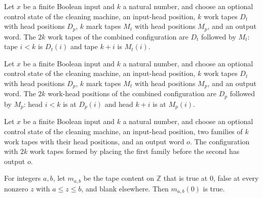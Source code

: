 \begin{lemma}
\label{Complexity.LogProg.ccfg_workTapes}
\leanok
{}
Let $x$ be a finite Boolean input and $k$ a natural number, and choose an optional
control state of the cleaning machine, an input-head position, $k$ work tapes $D_t$
with head positions $D_p$, $k$ mark tapes $M_t$ with head positions $M_p$, and an output
word. The $2k$ work tapes of the combined configuration are $D_t$ followed by $M_t$:
tape $i<k$ is $D_t(i)$ and tape $k+i$ is $M_t(i)$.
\end{lemma}

\begin{lemma}
\label{Complexity.LogProg.ccfg_workTapePos}
\leanok
{}
Let $x$ be a finite Boolean input and $k$ a natural number, and choose an optional
control state of the cleaning machine, an input-head position, $k$ work tapes $D_t$
with head positions $D_p$, $k$ mark tapes $M_t$ with head positions $M_p$, and an output
word. The $2k$ work-head positions of the combined configuration are $D_p$ followed by
$M_p$: head $i<k$ is at $D_p(i)$ and head $k+i$ is at $M_p(i)$.
\end{lemma}

\begin{lemma}
\label{Complexity.LogProg.ccfg_output}
\leanok
{}
Let $x$ be a finite Boolean input and $k$ a natural number, and choose an optional
control state of the cleaning machine, an input-head position, two families of $k$ work
tapes with their head positions, and an output word $o$. The configuration with $2k$
work tapes formed by placing the first family before the second has output $o$.
\end{lemma}

\begin{lemma}
\label{Complexity.LogProg.markI_zero}
\leanok
{}
For integers $a,b$, let $m_{a,b}$ be the tape content on $\mathbb{Z}$ that is true at
$0$, false at every nonzero $z$ with $a\le z\le b$, and blank elsewhere. Then
$m_{a,b}(0)$ is true.
\end{lemma}

